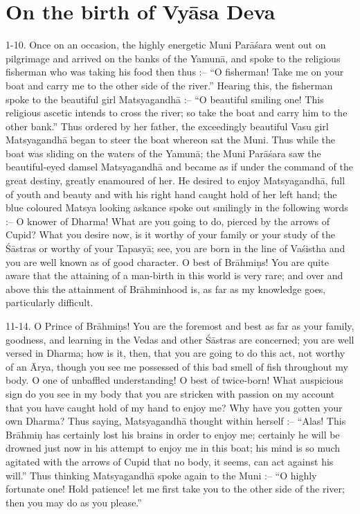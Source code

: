 \chapter{On the birth of Vy\=asa Deva}

1-10. Once on an occasion, the highly energetic Muni Par\=a\'sara went out on pilgrimage and arrived on the banks of the Yamun\=a, and spoke to the religious fisherman who was taking his food then thus :-- ``O fisherman! Take me on your boat and carry me to the other side of the river.'' Hearing this, the fisherman spoke to the beautiful girl Matsyagandh\=a :-- ``O beautiful smiling one! This religious ascetic intends to cross the river; so take the boat and carry him to the other bank.'' Thus ordered by her father, the exceedingly beautiful Vasu girl Matsyagandh\=a began to steer the boat whereon sat the Muni. Thus while the boat was sliding on the waters of the Yamun\=a; the Muni Par\=a\'sara saw the beautiful-eyed damsel Matsyagandh\=a and became as if under the command of the great destiny, greatly enamoured of her. He desired to enjoy Matsyagandh\=a, full of youth and beauty and with his right hand caught hold of her left hand; the blue coloured Matsya looking askance spoke out smilingly in the following words :-- O knower of Dharma! What are you going to do, pierced by the arrows of Cupid? What you desire now, is it worthy of your family or your study of the \'S\=astras or worthy of your Tapasy\=a; see, you are born in the line of Va\'sistha and you are well known as of good character. O best of Br\=ahmi\d{n}s! You are quite aware that the attaining of a man-birth in this world is very rare; and over and above this the attainment of Br\=ahminhood is, as far as my knowledge goes, particularly difficult.

11-14. O Prince of Br\=ahmi\d{n}s! You are the foremost and best as far as your family, goodness, and learning in the Vedas and other \'S\=astras are concerned; you are well versed in Dharma; how is it, then, that you are going to do this act, not worthy of an \=Arya, though you see me possessed of this bad smell of fish throughout my body. O one of unbaffled understanding! O best of twice-born! What auspicious sign do you see in my body that you are stricken with passion on my account that you have caught hold of my hand to enjoy me? Why have you gotten your own Dharma? Thus saying, Matsyagandh\=a thought within herself :-- ``Alas! This Br\=ahmi\d{n} has certainly lost his brains in order to enjoy me; certainly he will be drowned just now in his attempt to enjoy me in this boat; his mind is so much agitated with the arrows of Cupid that no body, it seems, can act against his will.'' Thus thinking Matsyagandh\=a spoke again to the Muni :-- ``O highly fortunate one! Hold patience! let me first take you to the other side of the river; then you may do as you please.''

